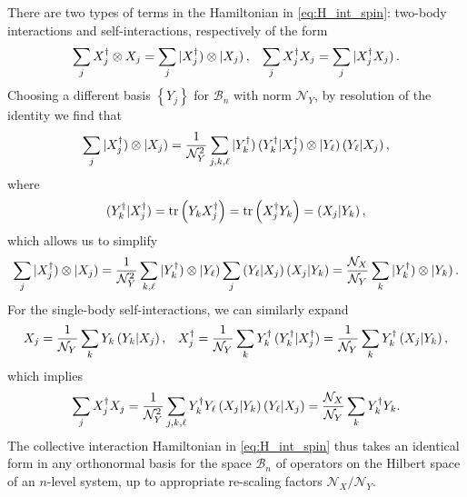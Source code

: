\documentclass[nofootinbib,notitlepage,11pt]{revtex4-2}
\newcommand{\f}[2]{\dfrac{#1}{#2}} %
\newcommand{\p}[1]{\left(#1\right)} %
\renewcommand{\set}[1]{\left\{#1\right\}} %
\newcommand{\1}{\mathds{1}}
\newcommand{\B}{\mathcal{B}}
\newcommand{\N}{\mathcal{N}}
\def\oket#1{\mathinner{|{#1})}}
\def\obk#1{\mathinner{({#1})}}
\begin{document}
There are two types of terms in the Hamiltonian in
\eqref{eq:H_int_spin}: two-body interactions and self-interactions,
respectively of the form
\begin{align}
  \sum_j X_j^\dag \otimes X_j
  = \sum_j \oket{X_j^\dag}\otimes\oket{X_j},
  &&
  \sum_j X_j^\dag X_j = \sum_j \oket{X_j^\dag X_j}.
\end{align}
Choosing a different basis $\set{Y_j}$ for $\B_n$ with norm $\N_Y$, by
resolution of the identity we find that
\begin{align}
  \sum_j \oket{X_j^\dag}\otimes\oket{X_j}
  = \f1{\N_Y^2} \sum_{j,k,\ell}
  \oket{Y_k^\dag} \obk{Y_k^\dag|X_j^\dag}
  \otimes \oket{Y_\ell} \obk{Y_\ell|X_j},
\end{align}
where
\begin{align}
  \obk{Y_k^\dag|X_j^\dag}
  = \tr\p{Y_k X_j^\dag}
  = \tr\p{X_j^\dag Y_k}
  = \obk{X_j|Y_k},
\end{align}
which allows us to simplify
\begin{align}
  \sum_j \oket{X_j^\dag}\otimes\oket{X_j}
  = \f1{\N_Y^2} \sum_{k,\ell}
  \oket{Y_k^\dag} \otimes \oket{Y_\ell}
  \sum_j \obk{Y_\ell|X_j} \obk{X_j|Y_k}
  = \f{\N_X}{\N_Y} \sum_k
  \oket{Y_k^\dag} \otimes \oket{Y_k}.
\end{align}
For the single-body self-interactions, we can similarly expand
\begin{align}
  X_j = \f1{\N_Y} \sum_k Y_k \obk{Y_k|X_j},
  &&
  X_j^\dag = \f1{\N_Y} \sum_k Y_k^\dag \obk{Y_k^\dag|X_j^\dag}
  = \f1{\N_Y} \sum_k Y_k^\dag \obk{X_j|Y_k},
\end{align}
which implies
\begin{align}
  \sum_j X_j^\dag X_j
  = \f1{\N_Y^2} \sum_{j,k,\ell} Y_k^\dag Y_\ell
  \obk{X_j|Y_k} \obk{Y_\ell|X_j}
  = \f{\N_X}{\N_Y} \sum_k Y_k^\dag Y_k.
\end{align}
The collective interaction Hamiltonian in \eqref{eq:H_int_spin} thus
takes an identical form in any orthonormal basis for the space $\B_n$
of operators on the Hilbert space of an $n$-level system, up to
appropriate re-scaling factors $\N_X/\N_Y$.


\end{document}
